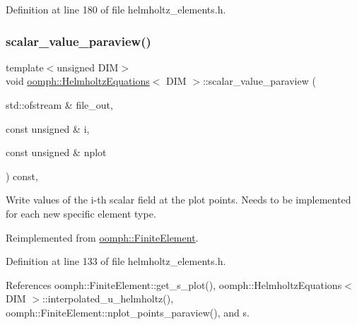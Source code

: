 Definition at line 180 of file helmholtz\+\_\+elements.\+h.

\mbox{\label{classoomph_1_1HelmholtzEquations_a7387cf17f2925a89a4ac9de760c4b359}} 
\subsubsection{\texorpdfstring{scalar\+\_\+value\+\_\+paraview()}{scalar\_value\_paraview()}}
{\footnotesize\ttfamily template$<$unsigned D\+IM$>$ \\
void \hyperlink{classoomph_1_1HelmholtzEquations}{oomph\+::\+Helmholtz\+Equations}$<$ D\+IM $>$\+::scalar\+\_\+value\+\_\+paraview (\begin{DoxyParamCaption}\item[{std\+::ofstream \&}]{file\+\_\+out,  }\item[{const unsigned \&}]{i,  }\item[{const unsigned \&}]{nplot }\end{DoxyParamCaption}) const\hspace{0.3cm}{\ttfamily [inline]}, {\ttfamily [virtual]}}



Write values of the i-\/th scalar field at the plot points. Needs to be implemented for each new specific element type. 



Reimplemented from \hyperlink{classoomph_1_1FiniteElement_a02cf8832a5e2886f1572bd36f7a7c1e3}{oomph\+::\+Finite\+Element}.



Definition at line 133 of file helmholtz\+\_\+elements.\+h.



References oomph\+::\+Finite\+Element\+::get\+\_\+s\+\_\+plot(), oomph\+::\+Helmholtz\+Equations$<$ D\+I\+M $>$\+::interpolated\+\_\+u\+\_\+helmholtz(), oomph\+::\+Finite\+Element\+::nplot\+\_\+points\+\_\+paraview(), and s.

\mbox{\label{classoomph_1_1HelmholtzEquations_a24ce807aa74efd08b3cde1fc74fbfc72}} 
